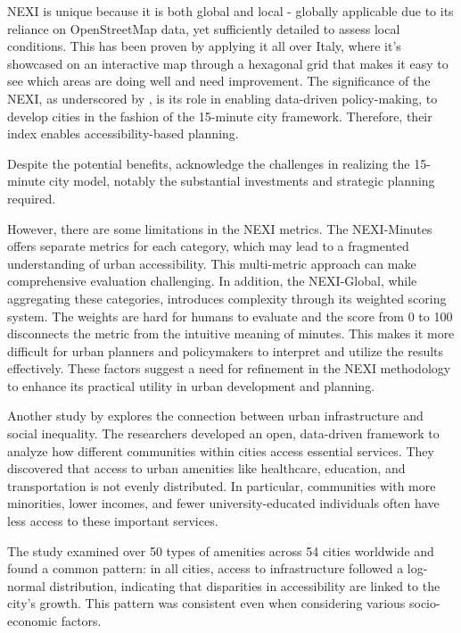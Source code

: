 NEXI is unique because it is both global and local - globally applicable due to its reliance on OpenStreetMap data, yet sufficiently detailed to assess local conditions.
This has been proven by applying it all over Italy, where it's showcased on an interactive map through a hexagonal grid that makes it easy to see which areas are doing well and need improvement.
The significance of the NEXI, as underscored by \cite{olivariAreItalianCities2023}, is its role in enabling data-driven policy-making, to develop cities in the fashion of the 15-minute city framework. 
Therefore, their index enables accessibility-based planning.

Despite the potential benefits, \cite{olivariAreItalianCities2023} acknowledge the challenges in realizing the 15-minute city model, notably the substantial investments and strategic planning required. 

However, there are some limitations in the NEXI metrics. 
The NEXI-Minutes offers separate metrics for each category, which may lead to a fragmented understanding of urban accessibility. 
This multi-metric approach can make comprehensive evaluation challenging. 
In addition, the NEXI-Global, while aggregating these categories, introduces complexity through its weighted scoring system. 
The weights are hard for humans to evaluate and the score from 0 to 100 disconnects the metric from the intuitive meaning of minutes.
This makes it more difficult for urban planners and policymakers to interpret and utilize the results effectively. 
These factors suggest a need for refinement in the NEXI methodology to enhance its practical utility in urban development and planning.


Another study by \cite{nicolettiDisadvantagedCommunitiesHave2023} explores the connection between urban infrastructure and social inequality. 
The researchers developed an open, data-driven framework to analyze how different communities within cities access essential services. 
They discovered that access to urban amenities like healthcare, education, and transportation is not evenly distributed. 
In particular, communities with more minorities, lower incomes, and fewer university-educated individuals often have less access to these important services.

The study examined over 50 types of amenities across 54 cities worldwide and found a common pattern: in all cities, access to infrastructure followed a log-normal distribution, indicating that disparities in accessibility are linked to the city's growth. 
This pattern was consistent even when considering various socio-economic factors.

